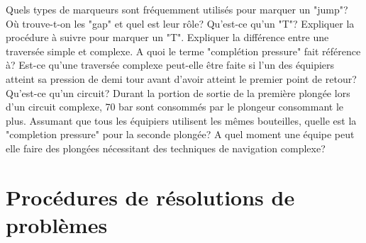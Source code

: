 \documentclass[english,10pt,a4paper]{article}
\begin{document}
	\begin{outline}
		\1 Quels types de marqueurs sont fréquemment utilisés pour marquer un "jump"?
		\1 Où trouve-t-on les "gap" et quel est leur rôle?
		\1 Qu’est-ce qu’un "T"?
		\1 Expliquer la procédure à suivre pour marquer un "T".
		\1 Expliquer la différence entre une traversée simple et complexe.
		\1 A quoi le terme "complétion pressure" fait référence à?
		\1 Est-ce qu’une traversée complexe peut-elle être faite si l’un des équipiers atteint sa pression de demi tour avant d’avoir atteint le premier point de retour?
		\1 Qu’est-ce qu’un circuit?
		\1 Durant la portion de sortie de la première plongée lors d’un circuit complexe, 70 bar sont consommés par le plongeur consommant le plus. Assumant que tous les équipiers utilisent les mêmes bouteilles, quelle est la "completion pressure"  pour la seconde plongée?
		\1 A quel moment une équipe peut elle faire des plongées nécessitant des techniques de navigation complexe?
	\end{outline}
	\sectionpage

	\section{Procédures de résolutions de problèmes}
\end{document}

